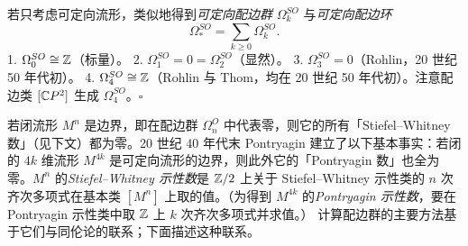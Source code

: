 若只考虑可定向流形，类似地得到\emph{可定向配边群} $\Omega^{SO}_k$ 与\emph{可定向配边环}
\[
  \Omega^{SO}_*=\sum_{k\ge0}\Omega^{SO}_k.
\]
 1. $\Omega^{SO}_0\cong\mathbb{Z}$（标量）。
2. $\Omega^{SO}_1=0=\Omega^{SO}_2$（显然）。
3. $\Omega^{SO}_3=0$（Rohlin，20 世纪 50 年代初）。
4. $\Omega^{SO}_4\cong\mathbb{Z}$（Rohlin 与 Thom，均在 20 世纪 50 年代初）。注意配边类 $[\mathbb{C}P^2]$ 生成 $\Omega^{SO}_4$。\hfill$\square$

若闭流形 $M^n$ 是边界，即在配边群 $\Omega^O_n$ 中代表零，则它的所有「Stiefel--Whitney 数」（见下文）都为零。20 世纪 40 年代末 Pontryagin 建立了以下基本事实：若闭的 $4k$ 维流形 $M^{4k}$ 是可定向流形的边界，则此外它的「Pontryagin 数」也全为零。$M^n$ 的\emph{Stiefel--Whitney 示性数}是 $\mathbb{Z}/2$ 上关于 Stiefel--Whitney 示性类的 $n$ 次齐次多项式在基本类 $[M^n]$ 上取的值。（为得到 $M^{4k}$ 的\emph{Pontryagin 示性数}，要在 Pontryagin 示性类中取 $\mathbb{Z}$ 上 $k$ 次齐次多项式并求值。）
计算配边群的主要方法基于它们与同伦论的联系；下面描述这种联系。

